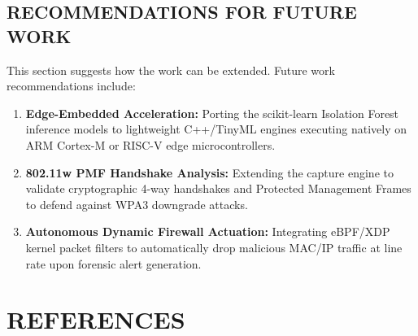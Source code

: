 \documentclass[11pt,a4paper]{report}
\begin{document}
\section{RECOMMENDATIONS FOR FUTURE WORK}
This section suggests how the work can be extended. Future work recommendations include:
\begin{enumerate}[leftmargin=*,itemsep=1.5pt,parsep=0pt,topsep=2pt]
    \item \textbf{Edge-Embedded Acceleration:} Porting the scikit-learn Isolation Forest inference models to lightweight C++/TinyML engines executing natively on ARM Cortex-M or RISC-V edge microcontrollers.
    \item \textbf{802.11w PMF Handshake Analysis:} Extending the capture engine to validate cryptographic 4-way handshakes and Protected Management Frames to defend against WPA3 downgrade attacks.
    \item \textbf{Autonomous Dynamic Firewall Actuation:} Integrating eBPF/XDP kernel packet filters to automatically drop malicious MAC/IP traffic at line rate upon forensic alert generation.
\end{enumerate}

\clearpage

\chapter*{REFERENCES}
\thispagestyle{plain}
\vspace*{-10pt}
\end{document}
